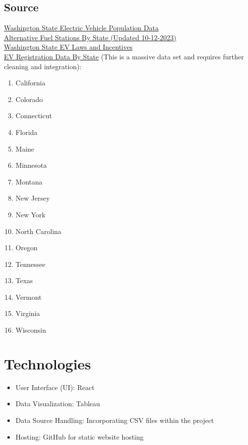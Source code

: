 \documentclass{article}
\begin{document}
\subsection*{Source}
\href{https://data.wa.gov/Transportation/Electric-Vehicle-Population-Data/f6w7-q2d2}{Washington State Electric Vehicle Population Data}\vspace*{5pt}\\
\href{https://afdc.energy.gov/data_download}{Alternative Fuel Stations By State (Updated 10-12-2023)}\vspace*{5pt}\\
\href{https://afdc.energy.gov/data_download}{Washington State EV Laws and Incentives}\vspace*{5pt}\\
\href{https://www.atlasevhub.com/materials/state-ev-registration-data/}{EV
Registration Data By State} (This is a massive data set and requires further
cleaning and integration):
\begin{multicols}{4}
    \begin{enumerate}[topsep=0pt, partopsep=0pt, itemsep=1pt, parsep=1pt]
        \item California
        \item Colorado
        \item Connecticut
        \item Florida
        \item Maine
        \item Minnesota
        \item Montana
        \item New Jersey
        \item New York
        \item North Carolina
        \item Oregon
        \item Tennessee
        \item Texas
        \item Vermont
        \item Virginia
        \item Wisconsin
    \end{enumerate}
\end{multicols}

\section*{Technologies}
\begin{itemize}[topsep=0pt, partopsep=0pt, itemsep=1pt, parsep=1pt, before=\vspace{0pt}]
    \item User Interface (UI): React
    \item Data Visualization: Tableau
    \item Data Source Handling: Incorporating CSV files within the project
    \item Hosting: GitHub for static website hosting
\end{itemize}
\end{document}
